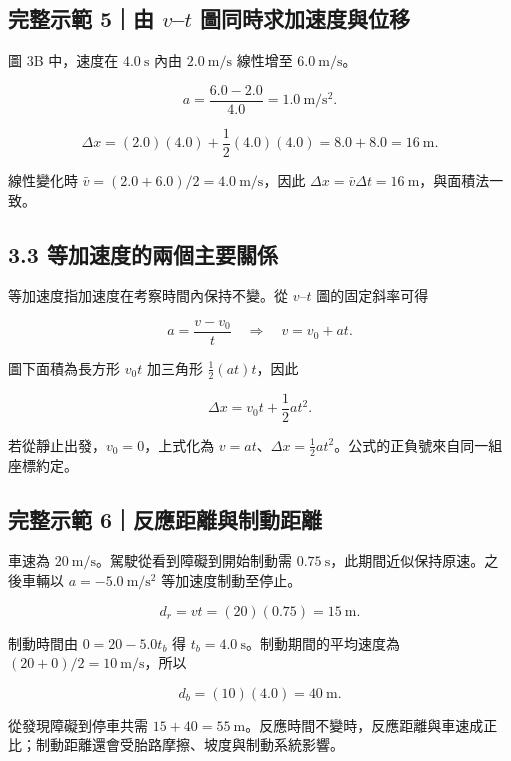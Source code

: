 \documentclass[11pt,a4paper]{article}
\begin{document}
\begin{HandoutWorkedExample}

\subsection{\texorpdfstring{完整示範 5｜由 \(v\)--\(t\) 圖同時求加速度與位移}{完整示範 5｜由 v--t 圖同時求加速度與位移}}\label{ux5b8cux6574ux793aux7bc4-5ux7531-vt-ux5716ux540cux6642ux6c42ux52a0ux901fux5ea6ux8207ux4f4dux79fb}

圖 3B 中，速度在 \(4.0\ \mathrm s\) 內由 \(2.0\ \mathrm{m/s}\) 線性增至 \(6.0\ \mathrm{m/s}\)。

\[
a=\frac{6.0-2.0}{4.0}=1.0\ \mathrm{m/s^2}.
\]

\[
\Delta x=(2.0)(4.0)+\frac{1}{2}(4.0)(4.0)=8.0+8.0=16\ \mathrm m.
\]

線性變化時 \(\bar v=(2.0+6.0)/2=4.0\ \mathrm{m/s}\)，因此 \(\Delta x=\bar v\Delta t=16\ \mathrm m\)，與面積法一致。

\end{HandoutWorkedExample}

\subsection{3.3 等加速度的兩個主要關係}\label{ux7b49ux52a0ux901fux5ea6ux7684ux5169ux500bux4e3bux8981ux95dcux4fc2}

等加速度指加速度在考察時間內保持不變。從 \(v\)--\(t\) 圖的固定斜率可得

\[
a=\frac{v-v_0}{t}
\quad\Rightarrow\quad
\boxed{v=v_0+at}.
\]

圖下面積為長方形 \(v_0t\) 加三角形 \(\frac{1}{2}(at)t\)，因此

\[
\boxed{\Delta x=v_0t+\frac{1}{2}at^2}.
\]

若從靜止出發，\(v_0=0\)，上式化為 \(v=at\)、\(\Delta x=\frac{1}{2}at^2\)。公式的正負號來自同一組座標約定。

\begin{HandoutWorkedExample}

\subsection{完整示範 6｜反應距離與制動距離}\label{ux5b8cux6574ux793aux7bc4-6ux53cdux61c9ux8dddux96e2ux8207ux5236ux52d5ux8dddux96e2}

車速為 \(20\ \mathrm{m/s}\)。駕駛從看到障礙到開始制動需 \(0.75\ \mathrm s\)，此期間近似保持原速。之後車輛以 \(a=-5.0\ \mathrm{m/s^2}\) 等加速度制動至停止。

\[
d_r=vt=(20)(0.75)=15\ \mathrm m.
\]

制動時間由 \(0=20-5.0t_b\) 得 \(t_b=4.0\ \mathrm s\)。制動期間的平均速度為 \((20+0)/2=10\ \mathrm{m/s}\)，所以

\[
d_b=(10)(4.0)=40\ \mathrm m.
\]

從發現障礙到停車共需 \(15+40=55\ \mathrm m\)。反應時間不變時，反應距離與車速成正比；制動距離還會受胎路摩擦、坡度與制動系統影響。

\end{HandoutWorkedExample}
\end{document}
